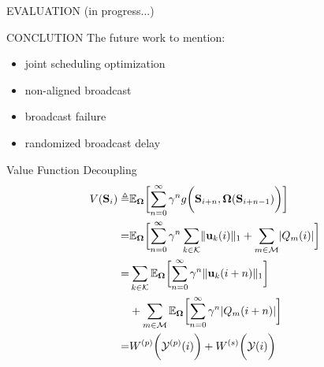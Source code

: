 \documentclass[10pt, conference, letterpaper]{IEEEtran}
\newcommand{\define}{\triangleq}
\renewcommand{\vec}{\mathbf}
\DeclarePairedDelimiter{\norm}{|}{|}
\DeclarePairedDelimiter{\Inorm}{\|}{\|_1}
\DeclarePairedDelimiter{\Paren}{\bigg(}{\bigg)}
\DeclarePairedDelimiter{\Bracket}{\bigg[}{\bigg]}
\newcommand{\apSet}{\mathcal{K}}
\newcommand{\esSet}{\mathcal{M}}
\newcommand{\Stat}{\mathbf{S}}
\newcommand{\Obsv}{\mathcal{Y}}
\newcommand{\Policy}{\mathbf{\Omega}}
\begin{document}
    \begin{section}{EVALUATION}
        \label{sec:evaluation}
        (in progress...)
    \end{section}

    \begin{section}{CONCLUTION}
        \label{sec:conclusion}
        The future work to mention:
        \begin{itemize}
            \item joint scheduling optimization
            \item non-aligned broadcast
            \item broadcast failure
            \item randomized broadcast delay
        \end{itemize}
    \end{section}
    
    \appendices

    \begin{section}{Value Function Decoupling}
        \label{value-decouple}
        \begin{align*}
            V(\Stat_i) \define& \mathbb{E}_{\Policy} \Bracket{\sum_{n=0}^{\infty} \gamma^{n} g\Paren{\Stat_{i+n},\Policy(\Stat_{i+n-1})}}
            \nonumber\\
            =& \mathbb{E}_{\Policy} \Bracket{\sum_{n=0}^{\infty} \gamma^{n} \sum_{k\in\apSet} \Inorm{\vec{u}_{k}(i)} + \sum_{m\in\esSet} \norm{Q_m(i)}}
            \nonumber\\
            =& \sum_{k\in\apSet} \mathbb{E}_{\Policy}\Bracket{\sum_{n=0}^{\infty} \gamma^{n} \Inorm{\vec{u}_k(i+n)}} 
                \nonumber\\
                &+\sum_{m\in\esSet} \mathbb{E}_{\Policy}\Bracket{\sum_{n=0}^{\infty} \gamma^{n} |Q_m(i+n)|}
            \nonumber\\
            =& W^{(p)}\Paren{\Obsv^{(p)}(i)} + W^{(s)}\Paren{\Obsv(i)}
        \end{align*}
    \end{section}
\end{document}
